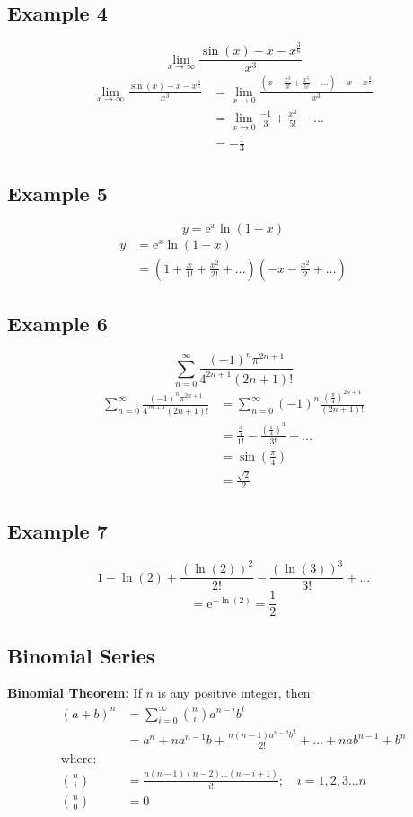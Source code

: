\documentclass[letterpaper, 12pt]{article}
\newcommand*{\e}{\mathrm{e}}
\begin{document}
\subsection*{Example 4}
\[ \lim_{x\to\infty}\frac{\sin(x)-x-x^{\frac{3}{6}}}{x^{3}} \]
\begin{align*}
  \lim_{x\to\infty}\frac{\sin(x)-x-x^{\frac{3}{6}}}{x^{3}} &=
    \lim_{x\to0}\frac{(x-\frac{x^{3}}{3!}+\frac{x^{5}}{5!}-...)
      -x-x^{\frac{3}{6}}}{x^{3}} \\
  &= \lim_{x\to0}\frac{-1}{3}+\frac{x^{2}}{5!}-... \\
  &= -\frac{1}{3}
\end{align*}

\subsection*{Example 5}
\[ y = \e^{x}\ln(1-x) \]
\begin{align*}
  y &= \e^{x}\ln(1-x) \\
  &= (1+\frac{x}{1!}+\frac{x^{2}}{2!}+...)(-x-\frac{x^{2}}{2}+...)
\end{align*}

\subsection*{Example 6}
\[ \sum_{n=0}^{\infty}\frac{(-1)^{n}\pi^{2n+1}}{4^{2n+1}(2n+1)!} \]
\begin{align*}
  \sum_{n=0}^{\infty}\frac{(-1)^{n}\pi^{2n+1}}{4^{2n+1}(2n+1)!}
    &= \sum_{n=0}^{\infty}(-1)^{n}\frac{(\frac{\pi}{4})^{2n+1}}{(2n+1)!} \\
  &= \frac{\frac{\pi}{4}}{1!}-\frac{(\frac{\pi}{4})^{3}}{3!}+... \\
  &= \sin(\frac{\pi}{4}) \\
  &= \frac{\sqrt{2}}{2}
\end{align*}

\subsection*{Example 7}
\[ 1-\ln(2)+\frac{(\ln(2))^{2}}{2!}-\frac{(\ln(3))^{3}}{3!}+... \]
\[ = \e^{-\ln(2)} = \frac{1}{2} \]

\subsection*{Binomial Series}
\textbf{Binomial Theorem:} If \( n \) is any positive integer, then:
\begin{align*}
  (a+b)^{n} &= \sum_{i=0}^{\infty}\binom{n}{i}a^{n-i}b^{i} \\
  &= a^{n}+na^{n-1}b+\frac{n(n-1)a^{n-2}b^{2}}{2!}+...+nab^{n-1}+b^{n} \\
  \mathrm{where:} \\
  \binom{n}{i} &= \frac{n(n-1)(n-2)...(n-i+1)}{i!}; \quad i=1,2,3...n \\
  \binom{n}{0} &= 0
\end{align*}
\end{document}
